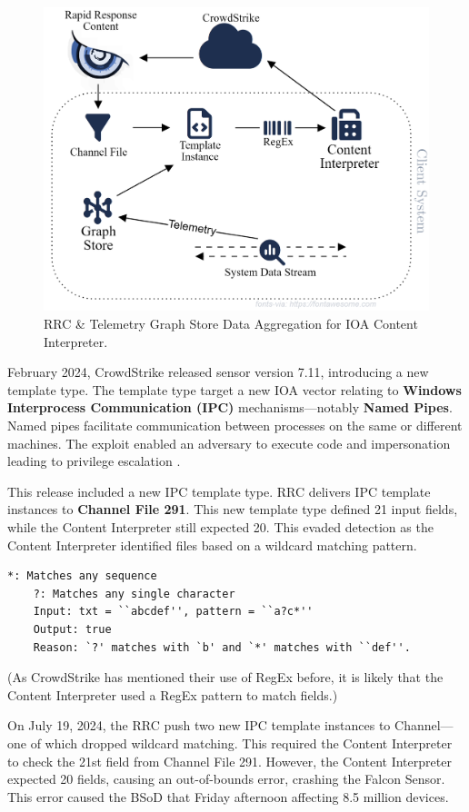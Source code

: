 \begin{enumerate}
   
    \begin{figure}[h!]
        \centering
        \includegraphics[width=.65\textwidth]{Sections/crowd/rrc.png}
        \caption{RRC \& Telemetry Graph Store Data Aggregation for IOA Content Interpreter.}
        \label{fig:channelfile}
    \end{figure}
\end{enumerate}

\vspace{-1em}
February 2024, CrowdStrike released sensor version 7.11, introducing a new template type.
The template type target a new IOA vector relating to \textbf{Windows Interprocess Communication (IPC)} mechanisms---notably \textbf{Named Pipes}.
Named pipes facilitate communication between processes on the same or different machines.
The exploit enabled an adversary to execute code and impersonation leading to privilege escalation \cite{sandker_named_pipes_2021}.

This release included a new IPC template type. RRC delivers IPC template instances to \textbf{Channel File 291}. This 
new template type defined 21 input fields, while the Content Interpreter still expected 20. This evaded detection 
as the Content Interpreter identified files based on a wildcard matching pattern.

\begin{lstlisting}[caption=Wildcard Pattern Matching Example]
    *: Matches any sequence 
    ?: Matches any single character
    Input: txt = ``abcdef'', pattern = ``a?c*''
    Output: true
    Reason: `?' matches with `b' and `*' matches with ``def''.
\end{lstlisting}
    
\noindent
(As CrowdStrike has mentioned their use of RegEx before, it is likely that the Content Interpreter used a RegEx pattern to match fields.)

On July 19, 2024, the RRC push two new IPC template instances to Channel---one of which dropped wildcard matching.
This required the Content Interpreter to check the 21st field from Channel File 291. However, the Content Interpreter
expected 20 fields, causing an out-of-bounds error, crashing the Falcon Sensor. This error 
caused the BSoD that Friday afternoon affecting 8.5 million devices.

